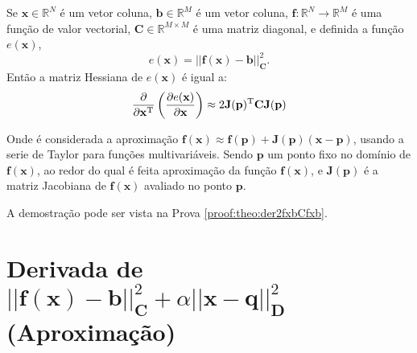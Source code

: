 \begin{theorem}\label{theo:der2fxbCfxb}
Se 
$\mathbf{x}\in \mathbb{R}^N$ é um vetor coluna, 
$\mathbf{b}\in \mathbb{R}^M$ é um vetor coluna,  
$\mathbf{f}: \mathbb{R}^{N}\rightarrow \mathbb{R}^{M}$ é uma função de valor vectorial,
$\mathbf{C} \in \mathbb{R}^{M\times M}$ é uma matriz diagonal, e
definida a função $e(\mathbf{x})$,
\begin{equation}
e(\mathbf{x})= ||\mathbf{f}(\mathbf{x})-\mathbf{b}||_{\mathbf{C}}^2.
\end{equation}
Então a matriz Hessiana de $e(\mathbf{x})$ é igual a:
\begin{equation}
\frac{\partial}{\partial \mathbf{x}^{\mathrm{T}}}\left(  
\frac{\partial e(\mathbf{x}) }{\partial \mathbf{x}} \right) \approx
2 \mathbf{J}(\mathbf{p})^{\mathrm{T}}\mathbf{C} \mathbf{J}(\mathbf{p})
\end{equation}

Onde é considerada a aproximação
$\mathbf{f}(\mathbf{x})\approx \mathbf{f}(\mathbf{p})+\mathbf{J}(\mathbf{p})\left(\mathbf{x}-\mathbf{p}\right)$,
usando a serie de Taylor para funções multivariáveis. Sendo $\mathbf{p}$ um ponto fixo no domínio de $\mathbf{f}(\mathbf{x})$,  ao redor do qual é feita  aproximação
da função $\mathbf{f}(\mathbf{x})$,
e $\mathbf{J}(\mathbf{p})$ é a matriz Jacobiana de $\mathbf{f}(\mathbf{x})$ avaliado no ponto $\mathbf{p}$.

A demostração pode ser vista na Prova \ref{proof:theo:der2fxbCfxb}.
\end{theorem}


\section{Derivada de $||\mathbf{f}(\mathbf{x})-\mathbf{b}||_{\mathbf{C}}^2+\alpha||\mathbf{x}-\mathbf{q}||_{\mathbf{D}}^2$  
(Aproximação)
}

